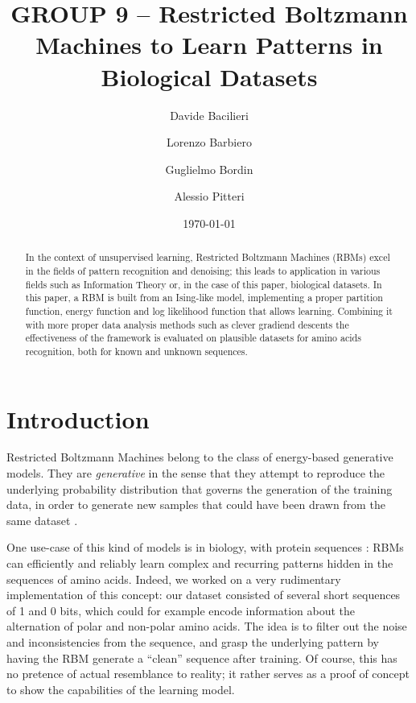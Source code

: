 \documentclass[prl, twocolumn]{revtex4-2}
\begin{document}
\title{GROUP 9 -- Restricted Boltzmann Machines to Learn Patterns in Biological Datasets}
\author{Davide Bacilieri}
\author{Lorenzo Barbiero}
\author{Guglielmo Bordin}
\author{Alessio Pitteri}
\date{\today}

\begin{abstract}
In the context of unsupervised learning, Restricted Boltzmann Machines
(RBMs) excel in the fields of pattern recognition and denoising; this leads
to application in various fields such as Information Theory or, in the case
of this paper, biological datasets.  In this paper, a RBM is built from an
Ising-like model, implementing a proper partition function, energy function
and log likelihood function that allows learning. Combining it with more
proper data analysis methods such as clever gradiend descents the
effectiveness of the framework is evaluated on plausible datasets for amino
acids recognition, both for known and unknown sequences.
\end{abstract}

\maketitle

\section{Introduction}
Restricted Boltzmann Machines belong to the class of energy-based
generative models. They are \emph{generative} in the sense that they
attempt to reproduce the underlying probability distribution that governs
the generation of the training data, in order to generate new samples that
could have been drawn from the same dataset \cite{Mehta2019}.

One use-case of this kind of models is in biology, with protein sequences
\cite{Tubiana2019, Tubiana2019_b}: RBMs can efficiently and reliably learn
complex and recurring patterns hidden in the sequences of amino acids.
Indeed, we worked on a very rudimentary implementation of this concept: our
dataset consisted of several short sequences of 1 and 0 bits, which could for 
example encode information about the alternation of polar and non-polar amino acids. 
The idea is to filter out the
noise and inconsistencies from the sequence, and grasp the underlying
pattern by having the RBM generate a “clean” sequence after training. Of
course, this has no pretence of actual resemblance to reality; it rather
serves as a proof of concept to show the capabilities of the learning
model.
\end{document}
